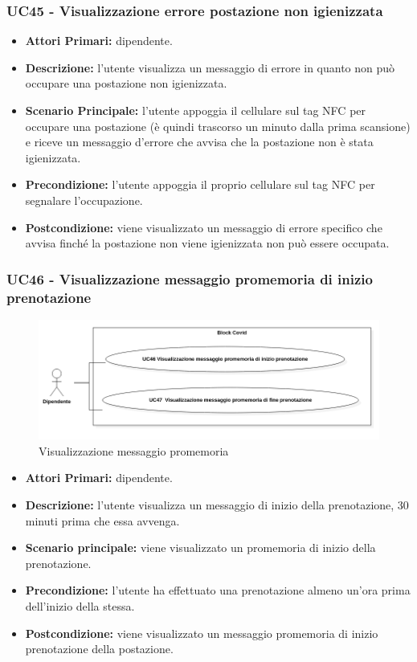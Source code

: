 \subsubsection{ UC45 - Visualizzazione errore postazione non igienizzata}
\begin{itemize}
	\item\textbf{Attori Primari:} dipendente.
	\item\textbf{Descrizione:} l’utente visualizza un messaggio di errore in quanto non può occupare una postazione non igienizzata.
	\item\textbf{Scenario Principale:} l'utente appoggia il cellulare sul tag NFC per occupare una postazione (è quindi trascorso un minuto dalla prima scansione) e riceve un messaggio d'errore che avvisa che la postazione non è stata igienizzata.
	\item\textbf{Precondizione:} l’utente appoggia il proprio cellulare sul tag NFC per segnalare l'occupazione. 
	\item\textbf{Postcondizione:} viene visualizzato un messaggio di errore specifico che avvisa finché la postazione non viene igienizzata non può essere occupata.
\end{itemize}

\subsubsection{ UC46 - Visualizzazione messaggio promemoria di inizio prenotazione}
\begin{figure}[H]
	\centering
	\includegraphics[width=18cm]{res/images/UC46-47.png}
	\caption{Visualizzazione messaggio promemoria}
	\label{fig:Visualizzazione messaggio promemoria}
\end{figure}
\begin{itemize}
	\item\textbf{Attori Primari:} dipendente.
	\item\textbf{Descrizione:} l’utente visualizza un messaggio di inizio della prenotazione, 30 minuti prima che essa avvenga.
	\item\textbf{Scenario principale:} viene visualizzato un promemoria di inizio della prenotazione.
	\item\textbf{Precondizione:} l’utente ha effettuato una prenotazione almeno un'ora prima dell'inizio della stessa.
	\item\textbf{Postcondizione:} viene visualizzato un messaggio promemoria di inizio prenotazione della postazione.
\end{itemize}

